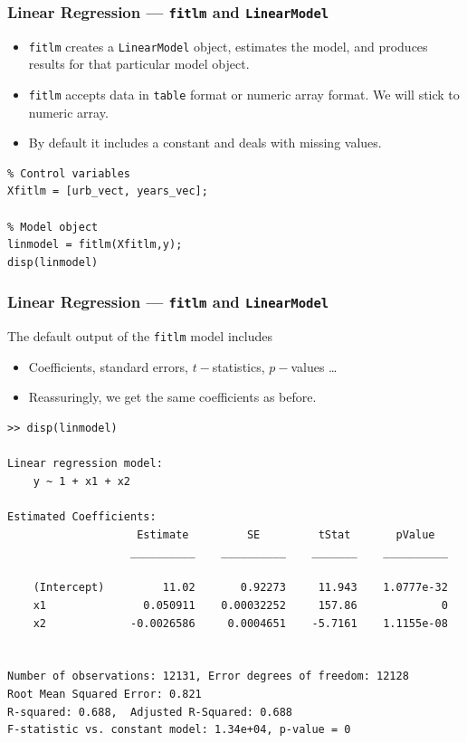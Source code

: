 \documentclass[11pt,xcolor={svgnames},aspectratio=169,usepdftitle=false]{beamer}
\begin{document}
\begin{frame}[fragile]
  \frametitle{Linear Regression --- \texttt{fitlm} and \texttt{LinearModel}}
\begin{itemize}
  \item \texttt{fitlm} creates a \texttt{LinearModel} object, estimates the model, and produces results for that particular model object.
  \item \texttt{fitlm} accepts data in \verb;table; format or numeric array format. We will stick to numeric array.
  \item By default it includes a constant and deals with missing values.
\end{itemize}
\begin{lstlisting}
% Control variables
Xfitlm = [urb_vect, years_vec];

% Model object
linmodel = fitlm(Xfitlm,y);
disp(linmodel)
\end{lstlisting}
\end{frame}

\begin{frame}[fragile]
  \frametitle{Linear Regression --- \texttt{fitlm} and \texttt{LinearModel}}
  The default output of the \verb;fitlm; model includes
\begin{itemize}
  \item Coefficients, standard errors, $t-$statistics, $p-$values \ldots
  \item Reassuringly, we get the same coefficients as before.
\end{itemize}
\begin{lstlisting}[basicstyle=\tiny\ttfamily]
>> disp(linmodel)

Linear regression model:
    y ~ 1 + x1 + x2

Estimated Coefficients:
                    Estimate         SE         tStat       pValue  
                   __________    __________    _______    __________

    (Intercept)         11.02       0.92273     11.943    1.0777e-32
    x1               0.050911    0.00032252     157.86             0
    x2             -0.0026586     0.0004651    -5.7161    1.1155e-08


Number of observations: 12131, Error degrees of freedom: 12128
Root Mean Squared Error: 0.821
R-squared: 0.688,  Adjusted R-Squared: 0.688
F-statistic vs. constant model: 1.34e+04, p-value = 0
\end{lstlisting}
\end{frame}
\end{document}
